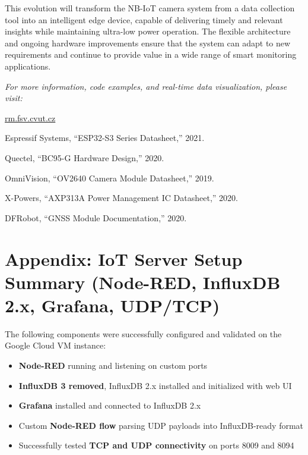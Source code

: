 \documentclass[11pt,a4paper]{article}
\begin{document}
This evolution will transform the NB-IoT camera system from a data collection tool into an intelligent edge device, capable of delivering timely and relevant insights while maintaining ultra-low power operation. The flexible architecture and ongoing hardware improvements ensure that the system can adapt to new requirements and continue to provide value in a wide range of smart monitoring applications.

\vspace{1cm}
\begin{center}
\textit{For more information, code examples, and real-time data visualization, please visit:}

\href{https://rm.fsv.cvut.cz}{rm.fsv.cvut.cz}\\

\end{center}

\begin{thebibliography}{9}
Espressif Systems, ``ESP32-S3 Series Datasheet,'' 2021.

Quectel, ``BC95-G Hardware Design,'' 2020.

OmniVision, ``OV2640 Camera Module Datasheet,'' 2019.

X-Powers, ``AXP313A Power Management IC Datasheet,'' 2020.

DFRobot, ``GNSS Module Documentation,'' 2020.
\end{thebibliography}

\appendix

\section*{Appendix: IoT Server Setup Summary (Node-RED, InfluxDB 2.x, Grafana, UDP/TCP)}

The following components were successfully configured and validated on the Google Cloud VM instance:

\begin{itemize}
  \item \textbf{Node-RED} running and listening on custom ports
  \item \textbf{InfluxDB 3 removed}, InfluxDB 2.x installed and initialized with web UI
  \item \textbf{Grafana} installed and connected to InfluxDB 2.x
  \item Custom \textbf{Node-RED flow} parsing UDP payloads into InfluxDB-ready format
  \item Successfully tested \textbf{TCP and UDP connectivity} on ports 8009 and 8094
\end{itemize}
\end{document}
